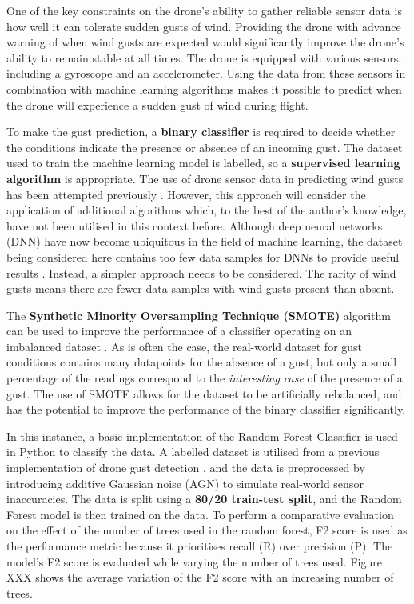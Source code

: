 One of the key constraints on the drone's ability to gather reliable sensor data is how well it can tolerate sudden gusts of wind. Providing the drone with advance warning of when wind gusts are expected would significantly improve the drone's ability to remain stable at all times. The drone is equipped with various sensors, including a gyroscope and an accelerometer. Using the data from these sensors in combination with machine learning algorithms makes it possible to predict when the drone will experience a sudden gust of wind during flight.

To make the gust prediction, a \textbf{binary classifier} is required to decide whether the conditions indicate the presence or absence of an incoming gust. The dataset used to train the machine learning model is labelled, so a \textbf{supervised learning algorithm} is appropriate. The use of drone sensor data in predicting wind gusts has been attempted previously \cite{gu2018wind}. However, this approach will consider the application of additional algorithms which, to the best of the author's knowledge, have not been utilised in this context before. Although deep neural networks (DNN) have now become ubiquitous in the field of machine learning, the dataset being considered here contains too few data samples for DNNs to provide useful results \cite{golestaneh2024samplesneededtraindeep}. Instead, a simpler approach needs to be considered. The rarity of wind gusts means there are fewer data samples with wind gusts present than absent.

The  \textbf{Synthetic Minority Oversampling Technique (SMOTE)} algorithm can be used to improve the performance of a classifier operating on an imbalanced dataset \cite{chawla2002smote}. As is often the case, the real-world dataset for gust conditions contains many datapoints for the absence of a gust, but only a small percentage of the readings correspond to the \textit{interesting case} of the presence of a gust. The use of SMOTE allows for the dataset to be artificially rebalanced, and has the potential to improve the performance of the binary classifier significantly.

In this instance, a basic implementation of the Random Forest Classifier \cite{scikit-learn} is used in Python to classify the data. A labelled dataset is utilised from a previous implementation of drone gust detection \cite{gu2018wind}, and the data is preprocessed by introducing additive Gaussian noise (AGN) to simulate real-world sensor inaccuracies. The data is split using a \textbf{80/20 train-test split}, and the Random Forest model is then trained on the data. To perform a comparative evaluation on the effect of the number of trees used in the random forest, F2 score is used as the performance metric because it prioritises recall (R) over precision (P). The model's F2 score is evaluated while varying the number of trees used. Figure XXX shows the average variation of the F2 score with an increasing number of trees. 

